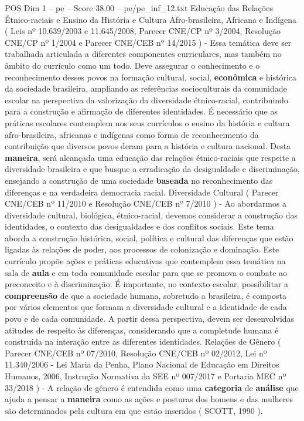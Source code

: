 \begin{textsample}{POS Dim 1 – pe – Score 38.00 – pe/pe\_inf\_12.txt}
Educação das Relações Étnico-raciais e Ensino da História e Cultura Afro-brasileira, Africana e Indígena ( Leis nº 10.639/2003 e 11.645/2008, Parecer CNE/CP nº 3/2004, Resolução CNE/CP nº 1/2004 e Parecer CNE/CEB nº 14/2015 ) - Essa temática deve ser trabalhada articulada a diferentes componentes curriculares, mas também no âmbito do currículo como um todo.
Deve assegurar o conhecimento e o reconhecimento desses povos na formação cultural, social, \textbf{econômica} e histórica da sociedade brasileira, ampliando as referências socioculturais da comunidade escolar na perspectiva da valorização da diversidade étnico-racial, contribuindo para a construção e afirmação de diferentes identidades.
É necessário que as práticas escolares contemplem nos seus currículos o ensino da história e cultura afro-brasileira, africanas e indígenas como forma de reconhecimento da contribuição que diversos povos deram para a história e cultura nacional.
Desta \textbf{maneira}, será alcançada uma educação das relações étnico-raciais que respeite a diversidade brasileira e que busque a erradicação da desigualdade e discriminação, ensejando a construção de uma sociedade \textbf{baseada} no reconhecimento das diferenças e na verdadeira democracia racial.
Diversidade Cultural ( Parecer CNE/CEB nº 11/2010 e Resolução CNE/CEB nº 7/2010 ) - Ao abordarmos a diversidade cultural, biológica, étnico-racial, devemos considerar a construção das identidades, o contexto das desigualdades e dos conflitos sociais.
Este tema aborda a construção histórica, social, política e cultural das diferenças que estão ligadas às relações de poder, aos processos de colonização e dominação.
Este currículo propõe ações e práticas educativas que contemplem essa temática na sala de \textbf{aula} e em toda comunidade escolar para que se promova o combate ao preconceito e à discriminação.
É importante, no contexto escolar, possibilitar a \textbf{compreensão} de que a sociedade humana, sobretudo a brasileira, é composta por vários elementos que formam a diversidade cultural e a identidade de cada povo e de cada comunidade.
A partir dessa perspectiva, devem ser desenvolvidas atitudes de respeito às diferenças, considerando que a completude humana é construída na interação entre as diferentes identidades.
Relações de Gênero ( Parecer CNE/CEB nº 07/2010, Resolução CNE/CEB nº 02/2012, Lei nº 11.340/2006 - Lei Maria da Penha, Plano Nacional de Educação em Direitos Humanos, 2006, Instrução Normativa da SEE nº 007/2017 e Portaria MEC nº 33/2018 ) - A relação de gênero é entendida como uma \textbf{categoria} de \textbf{análise} que ajuda a pensar a \textbf{maneira} como as ações e posturas dos homens e das mulheres são determinados pela cultura em que estão inseridos ( SCOTT, 1990 ).

\end{textsample}
